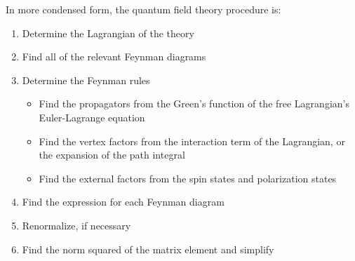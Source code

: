 \documentclass{report}
\begin{document}
In more condensed form, the quantum field theory procedure is:
\begin{enumerate}
    \item Determine the Lagrangian of the theory
    \item Find all of the relevant Feynman diagrams
    \item Determine the Feynman rules
    \begin{itemize}
        \item Find the propagators from the Green's function of the free Lagrangian's Euler-Lagrange equation
        \item Find the vertex factors from the interaction term of the Lagrangian, or the expansion of the path integral
        \item Find the external factors from the spin states and polarization states
    \end{itemize}
    
    \item Find the expression for each Feynman diagram
    \item Renormalize, if necessary
    \item Find the norm squared of the matrix element and simplify
\end{enumerate}
\end{document}

